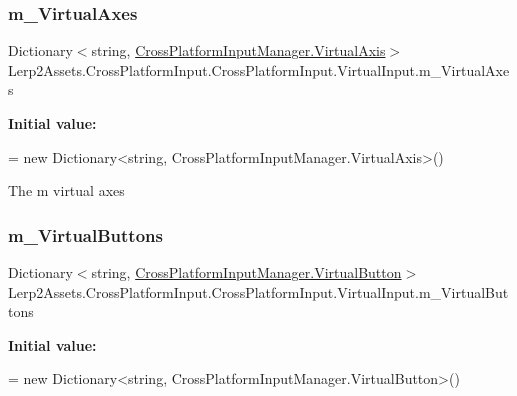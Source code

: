 \subsubsection{\texorpdfstring{m\+\_\+\+Virtual\+Axes}{m\_VirtualAxes}}
{\footnotesize\ttfamily Dictionary$<$string, \hyperlink{class_lerp2_assets_1_1_cross_platform_input_1_1_cross_platform_input_manager_1_1_virtual_axis}{Cross\+Platform\+Input\+Manager.\+Virtual\+Axis}$>$ Lerp2\+Assets.\+Cross\+Platform\+Input.\+Cross\+Platform\+Input.\+Virtual\+Input.\+m\+\_\+\+Virtual\+Axes\hspace{0.3cm}{\ttfamily [protected]}}

{\bfseries Initial value\+:}
\begin{DoxyCode}
=
            \textcolor{keyword}{new} Dictionary<string, CrossPlatformInputManager.VirtualAxis>()
\end{DoxyCode}


The m virtual axes 

\mbox{\label{class_lerp2_assets_1_1_cross_platform_input_1_1_cross_platform_input_1_1_virtual_input_a5e2cbf73500310144294c6fa57a2e885}} 
\subsubsection{\texorpdfstring{m\+\_\+\+Virtual\+Buttons}{m\_VirtualButtons}}
{\footnotesize\ttfamily Dictionary$<$string, \hyperlink{class_lerp2_assets_1_1_cross_platform_input_1_1_cross_platform_input_manager_1_1_virtual_button}{Cross\+Platform\+Input\+Manager.\+Virtual\+Button}$>$ Lerp2\+Assets.\+Cross\+Platform\+Input.\+Cross\+Platform\+Input.\+Virtual\+Input.\+m\+\_\+\+Virtual\+Buttons\hspace{0.3cm}{\ttfamily [protected]}}

{\bfseries Initial value\+:}
\begin{DoxyCode}
=
            \textcolor{keyword}{new} Dictionary<string, CrossPlatformInputManager.VirtualButton>()
\end{DoxyCode}


